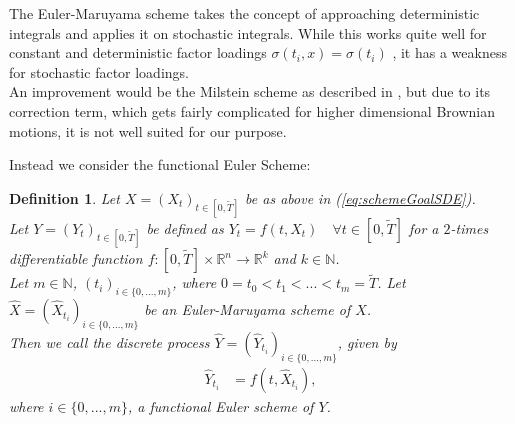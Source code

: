 \documentclass[12pt]{article}
\newtheorem{definition}[theorem]{Definition}
\begin{document}
	The Euler-Maruyama scheme takes the concept of approaching deterministic integrals and applies it on stochastic integrals. While this works quite well for constant and deterministic factor loadings $\sigma(t_i, x) = \sigma(t_i)$ \cite{kloedenSchemes}, it has a weakness for stochastic factor loadings.\\
	An improvement would be the Milstein scheme as described in \cite{kloedenSchemes}, but due to its correction term, which gets fairly complicated for higher dimensional Brownian motions, it is not well suited for our purpose.

	Instead we consider the functional Euler Scheme:
	\begin{definition}\label{def:funceulerscheme}
		Let $X=(X_t)_{t\in [0,\tilde{T}]}$ be as above in (\ref{eq:schemeGoalSDE}).\\
		Let $Y=(Y_t)_{t\in [0,\tilde{T}]}$ be defined as $Y_t = f(t, X_t) \quad \forall t\in [0,\tilde{T}]$ for a $2$-times differentiable function $f: [0,\tilde{T}] \times \mathbb{R}^n \rightarrow \mathbb{R}^k$ and $k \in \mathbb{N}$.\\
		Let $m \in \mathbb{N}$, $(t_i)_{i\in \{0, ..., m\}}$, where $0=t_0 < t_1 < ... < t_m=\tilde{T}$. Let  $\hat{X} = (\hat{X}_{t_i})_{i \in \{0, ..., m\}}$ be an Euler-Maruyama scheme of $X$.\\
		Then we call the discrete process $\hat{Y} = (\hat{Y}_{t_i})_{i \in \{0, ..., m\}}$, given by
		\begin{align*}
			\hat{Y}_{t_i} &= f(t,\hat{X}_{t_i}),
		\end{align*}
		where $i \in \{0, ..., m\}$, a \emph{functional Euler scheme of $Y$}.
	\end{definition}
\end{document}
